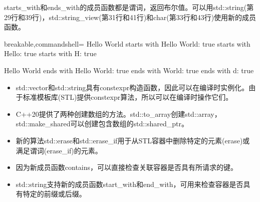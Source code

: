 starts\_with和ends\_with的成员函数都是谓词，返回布尔值。可以用std::string(第29行和39行)，std::string\_view(第31行和41行)和char(第33行和43行)使用新的成员函数。

\begin{tcblisting}{breakable,commandshell={}}
Hello World
            starts with Hello World: true
            starts with Hello: true
            starts with H: true
            
Hello World
            ends with Hello World: true
            ends with World: true
            ends with d: true
\end{tcblisting}

\begin{tcolorbox}[breakable,enhanced jigsaw,colback=mygreen!5!white,colframe=mygreen!75!black,title={总结}]
	
\begin{itemize}
\item 
std::vector和std::string具有constexpr构造函数，因此可以在编译时实例化。由于标准模板库(STL)提供constexpr算法，所以可以在编译时操作它们。

\item 
C++20提供了两种创建数组的方法。std::to\_array创建std::array，std::make\_shared可以创建包含数组的std::shared\_ptr。

\item 
新的算法std::erase和std::erase\_if用于从STL容器中删除特定的元素(erase)或满足谓词(erase\_if)的元素。

\item 
因为新成员函数contains，可以直接检查关联容器是否具有所请求的键。

\item 
std::string支持新的成员函数start\_with和end\_with，可用来检查容器是否具有特定的前缀或后缀。
\end{itemize}
	
\end{tcolorbox}


\newpage


















